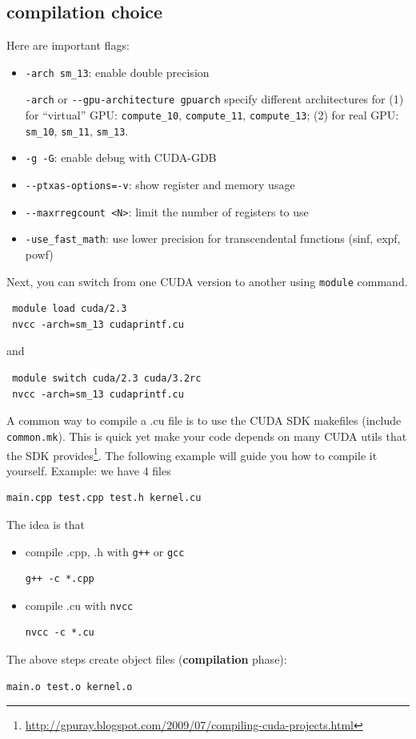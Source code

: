 \subsection{compilation choice}
\label{sec:compile_choice}

Here are important flags:
\begin{itemize}
\item \verb!-arch sm_13!: enable double precision 

  \verb!-arch! or \verb!--gpu-architecture gpuarch! specify different
  architectures for (1) for ``virtual'' GPU: \verb!compute_10!,
  \verb!compute_11!, \verb!compute_13!; (2) for real GPU:
  \verb!sm_10!, \verb!sm_11!, \verb!sm_13!.

\item \verb!-g -G!: enable debug with CUDA-GDB
\item \verb!--ptxas-options=-v!: show register and memory usage
\item \verb!--maxrregcount <N>!: limit the number of registers to use
\item \verb!-use_fast_math!: use lower precision for transcendental
  functions (sinf, expf, powf)
\end{itemize}

Next, you can switch from one CUDA version to another using \verb!module!
command.
\begin{lstlisting}
 module load cuda/2.3
 nvcc -arch=sm_13 cudaprintf.cu
\end{lstlisting}
and
\begin{lstlisting}
 module switch cuda/2.3 cuda/3.2rc
 nvcc -arch=sm_13 cudaprintf.cu
\end{lstlisting}




A common way to compile a .cu file is to use the CUDA SDK makefiles
(include \verb!common.mk!). This is quick yet make your code depends
on many CUDA utils that the SDK
provides\footnote{\url{http://gpuray.blogspot.com/2009/07/compiling-cuda-projects.html}}.
The following example will guide you how to compile it
yourself. Example: we have 4 files
\begin{verbatim}
main.cpp test.cpp test.h kernel.cu
\end{verbatim}
The idea is that 
\begin{itemize}
\item compile .cpp, .h with \verb!g++! or \verb!gcc!
\begin{verbatim}
g++ -c *.cpp
\end{verbatim}

\item compile .cu with \verb!nvcc!
\begin{verbatim}
nvcc -c *.cu
\end{verbatim}
\end{itemize}
The above steps create object files ({\bf compilation} phase):
\begin{verbatim}
main.o test.o kernel.o
\end{verbatim}

